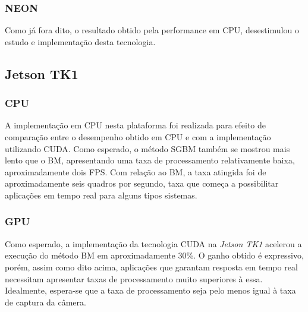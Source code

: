 \subsubsection{NEON}
Como já fora dito, o resultado obtido pela performance em CPU, desestimulou o estudo e implementação desta tecnologia.


\subsection{Jetson TK1}
\subsubsection{CPU}
A implementação em CPU nesta plataforma foi realizada para efeito de comparação entre o desempenho obtido em CPU e com a implementação utilizando CUDA. Como esperado, o método SGBM também se mostrou mais lento que o BM, apresentando uma taxa de processamento relativamente baixa, aproximadamente dois FPS. Com relação ao BM, a taxa atingida foi de aproximadamente seis quadros por segundo, taxa que começa a possibilitar aplicações em tempo real para alguns tipos sistemas.

\subsubsection{GPU}
Como esperado, a implementação da tecnologia CUDA na \textit{Jetson TK1} acelerou a execução do método BM em aproximadamente 30\%. O ganho obtido é expressivo, porém, assim como dito acima, aplicações que garantam resposta em tempo real necessitam apresentar taxas de processamento muito superiores à essa. Idealmente, espera-se que a taxa de processamento seja pelo menos igual à taxa de captura da câmera.
